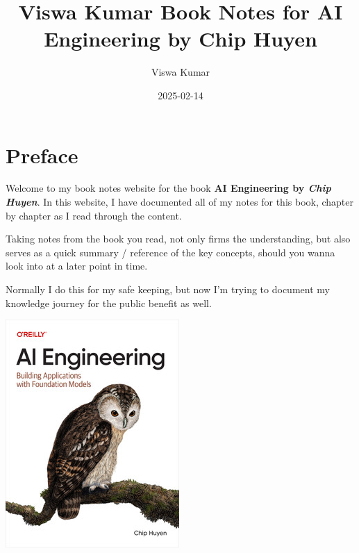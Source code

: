 \documentclass[
  letterpaper,
  DIV=11,
  numbers=noendperiod]{scrreprt}
\title{Viswa Kumar \textbar{} Book Notes for AI Engineering by Chip
Huyen}
\author{Viswa Kumar}
\date{2025-02-14}
\renewcommand*\contentsname{Table of contents}
\newcommand\contentsname{Table of contents}
\begin{document}
\maketitle

\renewcommand*\contentsname{Table of contents}
{
\hypersetup{linkcolor=}
\setcounter{tocdepth}{2}
\tableofcontents
}

\chapter*{Preface}\label{preface}


Welcome to my book notes website for the book \textbf{AI Engineering by
\emph{Chip Huyen}}. In this website, I have documented all of my notes
for this book, chapter by chapter as I read through the content.

Taking notes from the book you read, not only firms the understanding,
but also serves as a quick summary / reference of the key concepts,
should you wanna look into at a later point in time.

Normally I do this for my safe keeping, but now I'm trying to document
my knowledge journey for the public benefit as well.

\includegraphics{cover.jpeg}
\end{document}
